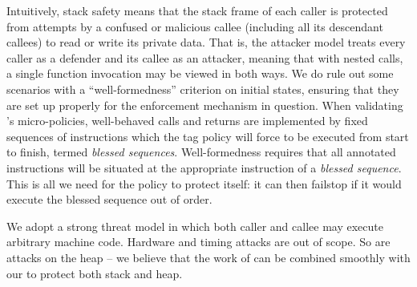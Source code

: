 \documentclass[acmsmall,review,anonymous]{acmart}\settopmatter{printfolios=true,printccs=false,printacmref=false}
\begin{document}
Intuitively, stack safety means that the stack frame of each caller is protected
from attempts by a confused or malicious callee (including all its
descendant callees) to read or write its private data.
That is, the attacker model treats every caller as a defender and its callee as
an attacker, meaning that with nested calls, a single function invocation
may be viewed in both ways. We do rule out some
scenarios with a ``well-formedness'' criterion on initial states, ensuring that
they are set up properly for the enforcement mechanism in question.
When validating \citeauthor{DBLP:conf/sp/RoesslerD18}'s micro-policies,
well-behaved calls and returns are implemented by fixed sequences of instructions
which the tag policy will force to be executed from start to finish,
termed {\em blessed sequences}. Well-formedness requires that all annotated
instructions will be situated at the appropriate instruction of a {\em blessed sequence}.
This is all we need for the policy to protect itself: it can then failstop if it would
execute the blessed sequence out of order.

We adopt a strong threat model in which both caller and callee may execute
arbitrary machine code. Hardware and timing attacks are out of scope.
So are attacks on the heap -- we believe that the work of
\citet{DBLP:conf/post/AmorimHP18} can be combined smoothly with our
to protect both stack and heap.



\end{document}

